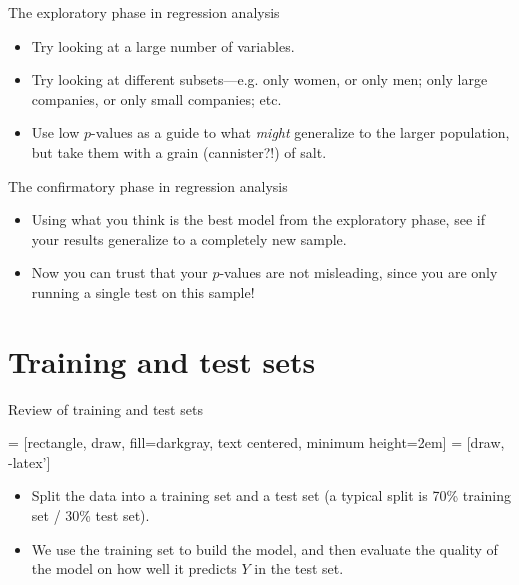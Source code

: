 \documentclass{beamer}\usepackage[]{graphicx}\usepackage[]{color}
\begin{document}
\begin{darkframes}
    \begin{frame}{The exploratory phase in regression analysis}
      \begin{itemize}
        \item Try looking at a large number of variables.
        \item Try looking at different subsets---e.g. only women, or only men; only large companies, or only small companies; etc.
        \item Use low $p$-values as a guide to what \emph{might} generalize to the larger population, but take them with a grain (cannister?!) of salt.
      \end{itemize}
    \end{frame}

    \begin{frame}{The confirmatory phase in regression analysis}
      \begin{itemize}
        \item Using what you think is the best model from the exploratory phase, see if your results generalize to a completely new sample.
        \item Now you can trust that your $p$-values are not misleading, since you are only running a single test on this sample!
      \end{itemize}
    \end{frame}

    \section{Training and test sets}

    \begin{frame}{Review of training and test sets}
      \begin{center}
         = [rectangle, draw, fill=darkgray,
          text centered, minimum height=2em]
         = [draw, -latex']

      \end{center}

      \begin{itemize}
        \item Split the data into a \alert{training set} and a \alert{test set} (a typical split is 70\% training set / 30\% test set).
        \item We use the training set to build the model, and then evaluate the quality of the model on how well it predicts $Y$ in the test set.
      \end{itemize}
    \end{frame}


\end{darkframes}
\end{document}
